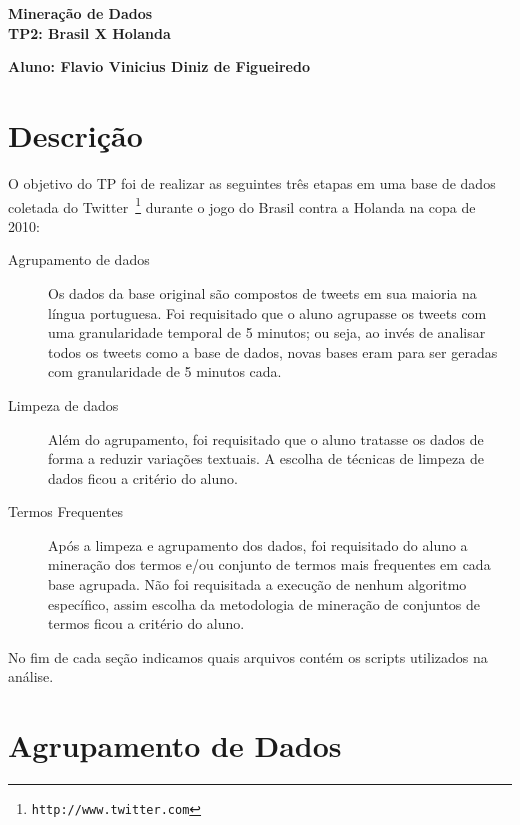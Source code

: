 \documentclass[brazil,a4paper,12pt]{article}
\begin{document}
\begin{center}
\LARGE
\textbf{Mineração de Dados}\\
\textbf{TP2: Brasil X Holanda}\\
\end{center}
\begin{center}
\textbf{Aluno: Flavio Vinicius Diniz de Figueiredo}
\end{center}

\section{Descrição}

O objetivo do TP foi de realizar as seguintes três etapas em uma base de dados 
coletada do Twitter~\footnote{\texttt{http://www.twitter.com}} durante o jogo
do Brasil contra a Holanda na copa de 2010:

\begin{description}

\item [Agrupamento de dados] Os dados da base original são compostos de tweets em 
sua maioria na língua portuguesa. Foi requisitado que o aluno agrupasse os tweets
com uma granularidade temporal de 5 minutos; ou seja, ao invés de analisar todos
os tweets como a base de dados, novas bases eram para ser geradas com granularidade
de 5 minutos cada. 

\item [Limpeza de dados] Além do agrupamento, foi requisitado que o aluno tratasse os 
dados de forma a reduzir variações textuais. A escolha de técnicas de limpeza de dados
ficou a critério do aluno.

\item [Termos Frequentes] Após a limpeza e agrupamento dos dados, foi requisitado
do aluno a mineração dos termos e/ou conjunto de termos mais frequentes em cada
base agrupada. Não foi requisitada a execução de nenhum algoritmo específico,
assim escolha da metodologia de mineração de conjuntos de termos ficou a critério
do aluno.

\end{description}

\noindent No fim de cada seção indicamos quais arquivos contém os scripts
utilizados na análise.

\section{Agrupamento de Dados}
\end{document}
